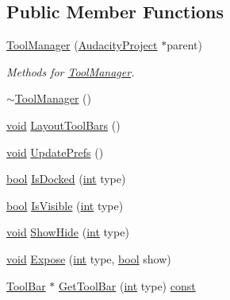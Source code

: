 \subsection*{Public Member Functions}
\begin{DoxyCompactItemize}
\item 
\hyperlink{class_tool_manager_ae4690f44a895498a8307ea4994cf01fb}{Tool\+Manager} (\hyperlink{class_audacity_project}{Audacity\+Project} $\ast$parent)
\begin{DoxyCompactList}\small\item\em Methods for \hyperlink{class_tool_manager}{Tool\+Manager}. \end{DoxyCompactList}\item 
\hyperlink{class_tool_manager_a242d9f322f17b81946a921764ea6c5dd}{$\sim$\+Tool\+Manager} ()
\item 
\hyperlink{sound_8c_ae35f5844602719cf66324f4de2a658b3}{void} \hyperlink{class_tool_manager_a710cbe49ca6a654a3b24b97731aad243}{Layout\+Tool\+Bars} ()
\item 
\hyperlink{sound_8c_ae35f5844602719cf66324f4de2a658b3}{void} \hyperlink{class_tool_manager_a3881703abeeeed86f77a04923302b73e}{Update\+Prefs} ()
\item 
\hyperlink{mac_2config_2i386_2lib-src_2libsoxr_2soxr-config_8h_abb452686968e48b67397da5f97445f5b}{bool} \hyperlink{class_tool_manager_a869bf68a783e673f12575b9e12e6e659}{Is\+Docked} (\hyperlink{xmltok_8h_a5a0d4a5641ce434f1d23533f2b2e6653}{int} type)
\item 
\hyperlink{mac_2config_2i386_2lib-src_2libsoxr_2soxr-config_8h_abb452686968e48b67397da5f97445f5b}{bool} \hyperlink{class_tool_manager_abc9cb944ffe6a55d6e10d5451c970165}{Is\+Visible} (\hyperlink{xmltok_8h_a5a0d4a5641ce434f1d23533f2b2e6653}{int} type)
\item 
\hyperlink{sound_8c_ae35f5844602719cf66324f4de2a658b3}{void} \hyperlink{class_tool_manager_a75f30a53686aadceb29c8763e68ddb33}{Show\+Hide} (\hyperlink{xmltok_8h_a5a0d4a5641ce434f1d23533f2b2e6653}{int} type)
\item 
\hyperlink{sound_8c_ae35f5844602719cf66324f4de2a658b3}{void} \hyperlink{class_tool_manager_a7ee78893e8e6a90d9878a216933dc480}{Expose} (\hyperlink{xmltok_8h_a5a0d4a5641ce434f1d23533f2b2e6653}{int} type, \hyperlink{mac_2config_2i386_2lib-src_2libsoxr_2soxr-config_8h_abb452686968e48b67397da5f97445f5b}{bool} show)
\item 
\hyperlink{class_tool_bar}{Tool\+Bar} $\ast$ \hyperlink{class_tool_manager_a63f20856a3acdd876fe131dfcfe25fe2}{Get\+Tool\+Bar} (\hyperlink{xmltok_8h_a5a0d4a5641ce434f1d23533f2b2e6653}{int} type) \hyperlink{getopt1_8c_a2c212835823e3c54a8ab6d95c652660e}{const} 

\end{DoxyCompactItemize}
